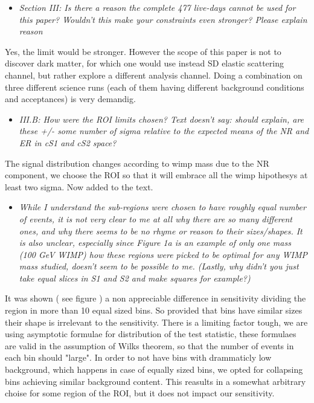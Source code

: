 \documentclass{article}
\begin{document}
\begin{itemize}
	\item{ \em{
Section III: Is there a reason the complete 477 live-days cannot be
used for this paper? Wouldn’t this make your constraints even
stronger? Please explain reason}}
\end{itemize}

Yes, the limit would be stronger. However the scope of this paper is 
not to discover dark matter, for which one would use instead SD elastic
scattering channel, but rather explore a different analysis channel.
Doing a combination on three different science runs (each of them having 
different background conditions and acceptances) is very demandig. 


\begin{itemize}
	\item \em{
III.B: How were the ROI limits chosen? Text doesn’t say: should
explain, are these +/- some number of sigma relative to the expected
means of the NR and ER in cS1 and cS2 space?}
\end{itemize}

{\color{red} The signal distribution changes according to wimp mass due to the NR component,
we choose the ROI so that it will embrace all the wimp hipothesys at least two 
sigma. Now added to the text.}


\begin{itemize}
	\item \em{
While I understand the sub-regions were chosen to have roughly equal
number of events, it is not very clear to me at all why there are so
many different ones, and why there seems to be no rhyme or reason to
their sizes/shapes. It is also unclear, especially since Figure 1a is
an example of only one mass (100 GeV WIMP) how these regions were
picked to be optimal for any WIMP mass studied, doesn’t seem to be
possible to me. (Lastly, why didn’t you just take equal slices in S1
and S2 and make squares for example?)}
\end{itemize}

It was shown ({\color{red} see figure} ) a non appreciable
difference in sensitivity dividing the region in more than 10 equal sized bins. 
So provided that bins have similar sizes their shape is irrelevant to the sensitivity.
There is a limiting factor tough, we are using asymptotic formulae for distribution of the
test statistic, these formulaes are valid in the assumption of Wilks theorem, so that the number
of events in each bin should "large". In order to not have bins with drammaticly low background, which
happens in case of equally sized bins, we opted for collapsing bins achieving similar background content. 
This reasults in a somewhat arbitrary choise for some region of the ROI, but it does not impact our sensitivity.
\end{document}
